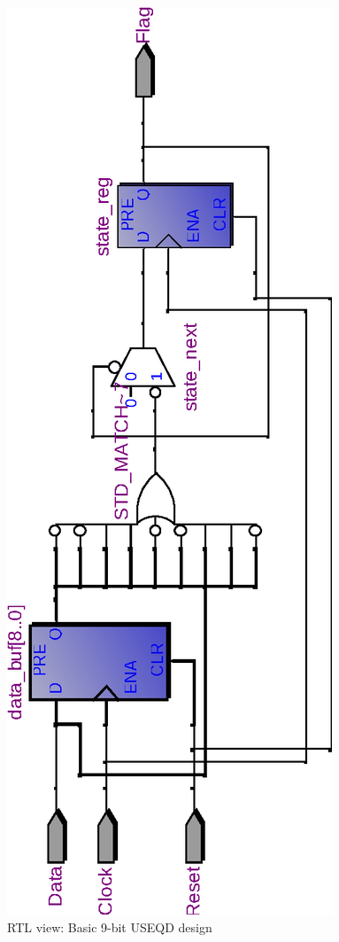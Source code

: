 \documentclass[10pt,a4paper]{report}
\begin{document}
\begin{figure} \center

\includegraphics[scale=0.6,angle=-90]{graphs/seq_test1.rtl_BASIC9.eps}
\caption{\small{RTL view: Basic 9-bit USEQD design}} \label{rtl:usd:1b}


\end{figure}
\end{document}
